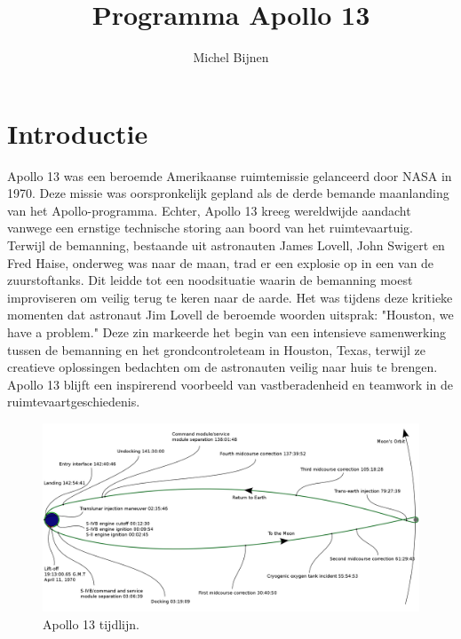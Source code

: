 \documentclass[
	a4paper, %
	10pt, %
	unnumberedsections, %
	twoside, %
]{LTJournalArticle}
\title{Programma Apollo 13} %
\author{%
	Michel Bijnen
}
\begin{document}
\maketitle %


\section{Introductie}

Apollo 13 was een beroemde Amerikaanse ruimtemissie gelanceerd door NASA in 1970. Deze missie was oorspronkelijk gepland als de derde bemande maanlanding van het Apollo-programma. Echter, Apollo 13 kreeg wereldwijde aandacht vanwege een ernstige technische storing aan boord van het ruimtevaartuig. Terwijl de bemanning, bestaande uit astronauten James Lovell, John Swigert en Fred Haise, onderweg was naar de maan, trad er een explosie op in een van de zuurstoftanks. Dit leidde tot een noodsituatie waarin de bemanning moest improviseren om veilig terug te keren naar de aarde. Het was tijdens deze kritieke momenten dat astronaut Jim Lovell de beroemde woorden uitsprak: "Houston, we have a problem." Deze zin markeerde het begin van een intensieve samenwerking tussen de bemanning en het grondcontroleteam in Houston, Texas, terwijl ze creatieve oplossingen bedachten om de astronauten veilig naar huis te brengen. Apollo 13 blijft een inspirerend voorbeeld van vastberadenheid en teamwork in de ruimtevaartgeschiedenis.

\begin{figure}
	\includegraphics[width=\linewidth]{Figures/Timeline.png}
	\caption{Apollo 13 tijdlijn.}
	\label{fig:timeline}
\end{figure}
\end{document}
